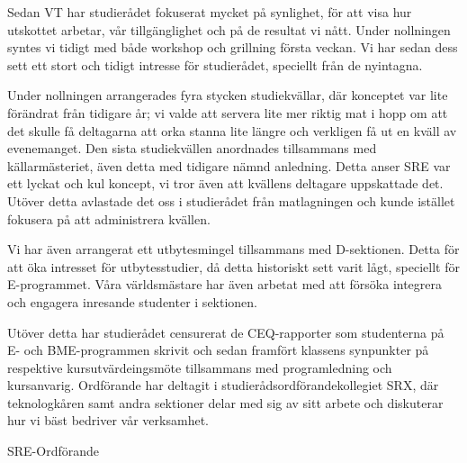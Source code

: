 \documentclass[../_main/handlingar.tex]{subfiles}
\begin{document}

Sedan VT har studierådet fokuserat mycket på synlighet, för att visa hur utskottet arbetar, vår tillgänglighet och på de resultat vi nått. Under nollningen syntes vi tidigt med både workshop och grillning första veckan. Vi har sedan dess sett ett stort och tidigt intresse för studierådet, speciellt från de nyintagna.

Under nollningen arrangerades fyra stycken studiekvällar, där konceptet var lite förändrat från tidigare år; vi valde att servera lite mer riktig mat i hopp om att det skulle få deltagarna att orka stanna lite längre och verkligen få ut en kväll av evenemanget. Den sista studiekvällen anordnades tillsammans med källarmästeriet, även detta med tidigare nämnd anledning. Detta anser SRE var ett lyckat och kul koncept, vi tror även att kvällens deltagare uppskattade det. Utöver detta avlastade det oss i studierådet från matlagningen och kunde istället fokusera på att administrera kvällen.

Vi har även arrangerat ett utbytesmingel tillsammans med D-sektionen. Detta för att öka intresset för utbytesstudier, då detta historiskt sett varit lågt, speciellt för E-programmet. Våra världsmästare har även arbetat med att försöka integrera och engagera inresande studenter i sektionen.

Utöver detta har studierådet censurerat de CEQ-rapporter som studenterna på E- och BME-programmen skrivit och sedan framfört klassens synpunkter på respektive kursutvärdeingsmöte tillsammans med programledning och kursanvarig. Ordförande har deltagit i studierådsordförandekollegiet SRX, där teknologkåren samt andra sektioner delar med sig av sitt arbete och diskuterar hur vi bäst bedriver vår verksamhet.

\begin{signatures}{1}
    \mvh
    \signature{Edvard Carlsson}{SRE-Ordförande}
\end{signatures}
\end{document}
